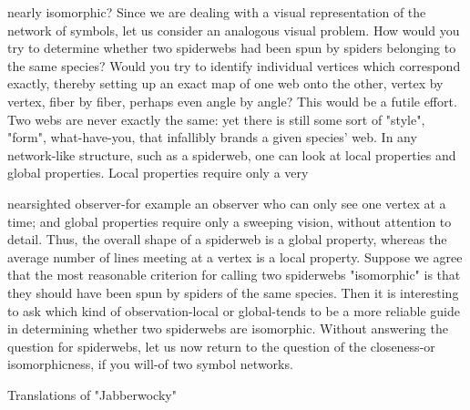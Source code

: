 nearly isomorphic? Since we are dealing with a visual representation of the network of
symbols, let us consider an analogous visual problem. How would you try to determine
whether two spiderwebs had been spun by spiders belonging to the same species? Would
you try to identify individual vertices which correspond exactly, thereby setting up an
exact map of one web onto the other, vertex by vertex, fiber by fiber, perhaps even angle
by angle? This would be a futile effort. Two webs are never exactly the same: yet there is
still some sort of "style", "form", what-have-you, that infallibly brands a given species'
web.
        In any network-like structure, such as a spiderweb, one can look at local
properties and global properties. Local properties require only a very





nearsighted observer-for example an observer who can only see one vertex at a time; and
global properties require only a sweeping vision, without attention to detail. Thus, the
overall shape of a spiderweb is a global property, whereas the average number of lines
meeting at a vertex is a local property. Suppose we agree that the most reasonable
criterion for calling two spiderwebs "isomorphic" is that they should have been spun by
spiders of the same species. Then it is interesting to ask which kind of observation-local
or global-tends to be a more reliable guide in determining whether two spiderwebs are
isomorphic. Without answering the question for spiderwebs, let us now return to the
question of the closeness-or isomorphicness, if you will-of two symbol networks.

                             Translations of "Jabberwocky"

